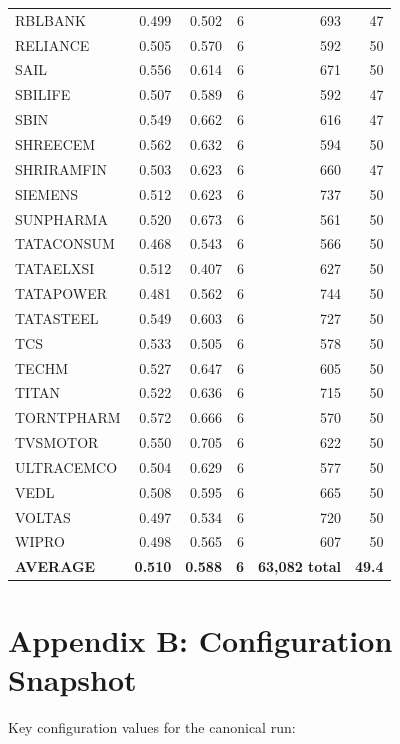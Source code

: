 \begin{small}
\begin{longtable}{l r r r r r}
RBLBANK     & 0.499 & 0.502 & 6 & 693 & 47 \\
RELIANCE    & 0.505 & 0.570 & 6 & 592 & 50 \\
SAIL        & 0.556 & 0.614 & 6 & 671 & 50 \\
SBILIFE     & 0.507 & 0.589 & 6 & 592 & 47 \\
SBIN        & 0.549 & 0.662 & 6 & 616 & 47 \\
SHREECEM    & 0.562 & 0.632 & 6 & 594 & 50 \\
SHRIRAMFIN  & 0.503 & 0.623 & 6 & 660 & 47 \\
SIEMENS     & 0.512 & 0.623 & 6 & 737 & 50 \\
SUNPHARMA   & 0.520 & 0.673 & 6 & 561 & 50 \\
TATACONSUM  & 0.468 & 0.543 & 6 & 566 & 50 \\
TATAELXSI   & 0.512 & 0.407 & 6 & 627 & 50 \\
TATAPOWER   & 0.481 & 0.562 & 6 & 744 & 50 \\
TATASTEEL   & 0.549 & 0.603 & 6 & 727 & 50 \\
TCS         & 0.533 & 0.505 & 6 & 578 & 50 \\
TECHM       & 0.527 & 0.647 & 6 & 605 & 50 \\
TITAN       & 0.522 & 0.636 & 6 & 715 & 50 \\
TORNTPHARM  & 0.572 & 0.666 & 6 & 570 & 50 \\
TVSMOTOR    & 0.550 & 0.705 & 6 & 622 & 50 \\
ULTRACEMCO  & 0.504 & 0.629 & 6 & 577 & 50 \\
VEDL        & 0.508 & 0.595 & 6 & 665 & 50 \\
VOLTAS      & 0.497 & 0.534 & 6 & 720 & 50 \\
WIPRO       & 0.498 & 0.565 & 6 & 607 & 50 \\
\midrule
\textbf{AVERAGE} & \textbf{0.510} & \textbf{0.588} & \textbf{6} & \textbf{63{,}082 total} & \textbf{49.4} \\
\end{longtable}
\end{small}

\section*{Appendix B: Configuration Snapshot}

Key configuration values for the canonical run:

